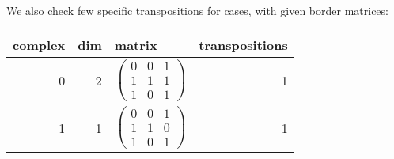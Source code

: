 \documentclass{article}
\begin{document}
\par We also check few specific transpositions for cases, with given border matrices:
\begin{center}
\begin{tabular}{rrlr}
\toprule
complex & dim & matrix & transpositions \\
\midrule
0 & 2 & $\begin{pmatrix}
0 & 0 & 1 \\
1 & 1 & 1 \\
1 & 0 & 1
\end{pmatrix}
$ & 1 \\
1 & 1 & $\begin{pmatrix}
0 & 0 & 1 \\
1 & 1 & 0 \\
1 & 0 & 1
\end{pmatrix}
$ & 1 \\
\bottomrule
\end{tabular}

\end{center}
\end{document}

